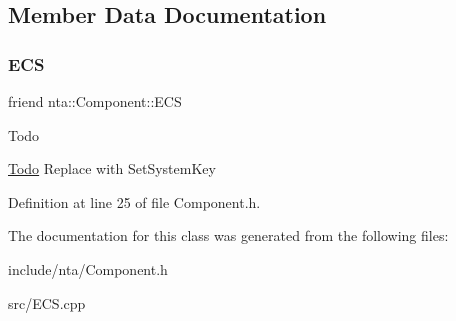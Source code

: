 \subsection{Member Data Documentation}
\mbox{\label{classnta_1_1Component_abed0426a01836855941e0236441eaf76}} 
\subsubsection{\texorpdfstring{E\+CS}{ECS}}
{\footnotesize\ttfamily friend nta\+::\+Component\+::\+E\+CS}

\begin{DoxyRefDesc}{Todo}
\item[\hyperlink{todo__todo000002}{Todo}]Replace with Set\+System\+Key \end{DoxyRefDesc}


Definition at line 25 of file Component.\+h.



The documentation for this class was generated from the following files\+:\begin{DoxyCompactItemize}
\item 
include/nta/Component.\+h\item 
src/E\+C\+S.\+cpp\end{DoxyCompactItemize}
